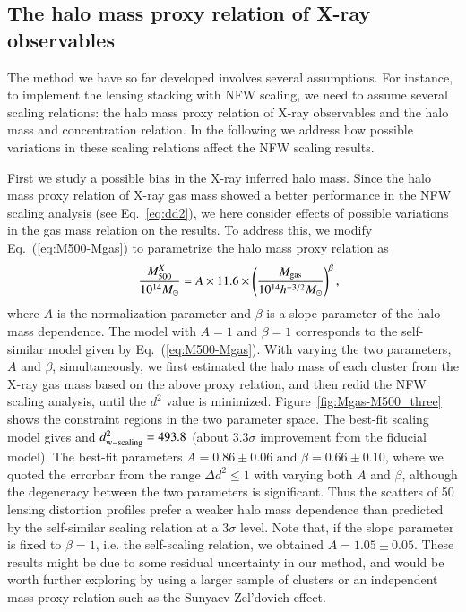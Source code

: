 \documentclass[iop, apj]{emulateapj}
\newcommand{\?}{\stackrel{?}{=}}
\begin{document}
\subsection{The halo mass proxy relation of X-ray observables}
\label{ssec:xraymass}
The method we have so far developed involves several assumptions. For
instance, to implement the lensing stacking with NFW scaling, we need to
assume several scaling relations: the halo mass proxy relation of X-ray
observables and the halo mass and concentration relation. In the
following we address how possible variations in these scaling relations
affect the NFW scaling results.

First we study a possible bias in the X-ray inferred halo mass. Since
the halo mass proxy relation of X-ray gas mass showed a better
performance in the NFW scaling analysis (see Eq.~\ref{eq:dd2}), we here
consider effects of possible variations in the gas mass relation on the
results. To address this, we modify Eq.~(\ref{eq:M500-Mgas}) to
parametrize the halo mass proxy relation as
%
\begin{eqnarray}
&& \frac{M^X_{\rm 500}}{10^{14}M_\odot} =A\times 11.6\times \left(
\frac{M_{\rm  gas}}{10^{14} h^{-3/2}M_\odot}	\right)^\beta,
\end{eqnarray}
%
where $A$ is the normalization parameter and $\beta$ is a slope
parameter of the halo mass dependence. The model with $A=1$ and
$\beta=1$ corresponds to the self-similar model given by
Eq.~(\ref{eq:M500-Mgas}).  With varying the two parameters, $A$ and
$\beta$, simultaneously, we first estimated the halo mass of each
cluster from the X-ray gas mass based on the above proxy relation, and
then redid the NFW scaling analysis, until the $d^2$ value is
minimized. Figure~\ref{fig:Mgas-M500_three} shows the constraint regions
in the two parameter space.
The best-fit scaling model gives and $d^2_{\rm w-scaling}=493.8$ (about
3.3$\sigma$ improvement from the fiducial model).  The best-fit
parameters $A=0.86\pm 0.06$ and $\beta=0.66\pm 0.10$, where we quoted
the errorbar from the range $\Delta d^2\le 1$ with varying both $A$ and
$\beta$, although the degeneracy between the two parameters is
significant.  Thus the scatters of 50 lensing distortion profiles prefer
a weaker halo mass dependence than predicted by the self-similar scaling
relation at a 3$\sigma$ level.  Note that, if the slope parameter is
fixed to $\beta=1$, i.e. the self-scaling relation, we obtained
$A=1.05\pm 0.05$. These results might be due to some residual
uncertainty in our method, and would be worth further exploring by using
a larger sample of clusters or an independent mass proxy relation such
as the Sunyaev-Zel'dovich effect. 
\end{document}

